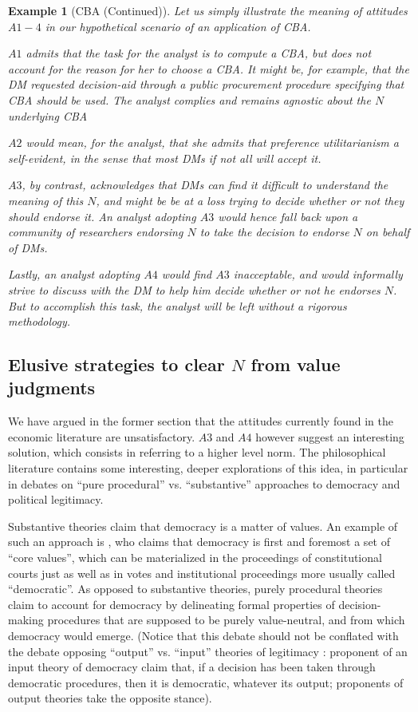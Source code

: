 \documentclass[preprint, french, english, 11pt, authoryear]{elsarticle}%
\newcommand{\protectforpdf}[1]{\texorpdfstring{\ensuremath{#1}}{#1}}
\newtheorem{example}{Example}
\begin{document}
\begin{example}[CBA (Continued)]
Let us simply illustrate the meaning of attitudes $A1-4$ in our hypothetical scenario of an application of CBA.

$A1$ admits that the task for the analyst is to compute a CBA, but does not account for the reason for her to choose a CBA. It might be, for example, that the \ac{DM} requested decision-aid through a public procurement procedure specifying that CBA should be used. The analyst complies and remains agnostic about the $N$ underlying CBA

$A2$ would mean, for the analyst, that she admits that preference utilitarianism a self-evident, in the sense that most \acp{DM} if not all will accept it.

$A3$, by contrast, acknowledges that \acp{DM} can find it difficult to understand the meaning of this $N$, and might be be at a loss trying to decide whether or not they should endorse it. An analyst adopting $A3$ would hence fall back upon a community of researchers endorsing $N$ to take the decision to endorse $N$ on behalf of \acp{DM}.

Lastly, an analyst adopting $A4$ would find $A3$ inacceptable, and would informally strive to discuss with the \ac{DM} to help him decide whether or not he endorses $N$. But to accomplish this task, the analyst will be left without a rigorous methodology.
\end{example}


\subsection{Elusive strategies to clear \protectforpdf{N} from value judgments}
We have argued in the former section that the attitudes currently found in the economic literature are unsatisfactory. $A3$ and $A4$ however suggest an interesting solution, which consists in referring to a higher level norm. The philosophical literature contains some interesting, deeper explorations of this idea, in particular in debates on “pure procedural” vs. “substantive” approaches to democracy and political legitimacy.

Substantive theories claim that democracy is a matter of values. An example of such an approach is \cite{brettschneider_value_2006}, who claims that democracy is first and foremost a set of “core values”, which can be materialized in the proceedings of constitutional courts just as well as in votes and institutional proceedings more usually called “democratic”. As opposed to substantive theories, purely procedural theories claim to account for democracy by delineating formal properties of decision-making procedures that are supposed to be purely value-neutral, and from which democracy would emerge. (Notice that this debate should not be conflated with the debate opposing “output” vs. “input” theories of legitimacy \citep{vatn_environmental_2016, backstrand_environmental_2010}: proponent of an input theory of democracy claim that, if a decision has been taken through democratic procedures, then it is democratic, whatever its output; proponents of output theories take the opposite stance).
\end{document}
